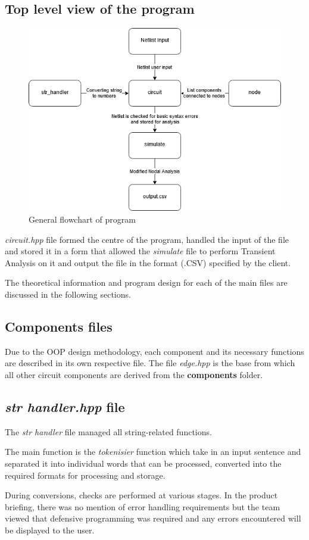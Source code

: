 \documentclass[12pt,a4paper]{article}
\begin{document}
	\subsection{Top level view of the program}
	\begin{figure} [h!]
		\centering
		\includegraphics[scale=0.5]{Flow chart.PNG}
		\caption{General flowchart of program}
	\end{figure}
	\textit{circuit.hpp} file formed the centre of the program, handled the input of the file and 
	stored it in a form that allowed the \textit{simulate} file to perform Transient Analysis on it and output
	the file in the format (.CSV) specified by the client.
	\par
	The theoretical information and program design for each of the main files are discussed in the following 
	sections.
	\pagebreak
	\subsection{Components files}
	Due to the OOP design methodology, each component and its necessary functions are described in its own
	respective file. The file \textit{edge.hpp} is the base from which all other circuit components are derived
	from the \textbf{components} folder. 
	\subsection{\textit{str handler.hpp} file}
	The \textit{str handler} file managed all string-related functions. \par
	The main function is the \textit{tokenisier} function which take in an 
	input sentence and separated it into individual words that can be processed, 
	converted into the required formats for processing and storage. \par
	During conversions, checks are performed at various stages. In the product briefing, there
	was no mention of error handling requirements but the team viewed that defensive programming 
	was required and any errors encountered will be displayed to the user. 
\end{document}
